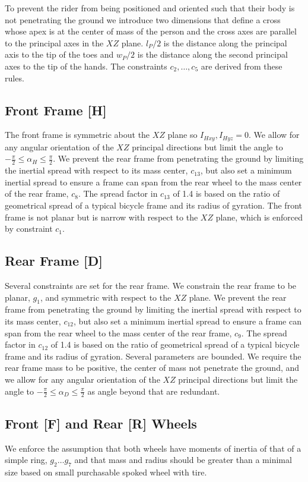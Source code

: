 \documentclass{bmd2019p}
\begin{document}
To prevent the rider from being positioned and oriented such that their body is
not penetrating the ground we introduce two dimensions that define a cross
whose apex is at the center of mass of the person and the cross axes are
parallel to the principal axes in the $XZ$ plane. $l_P / 2$ is the distance
along the principal axis to the tip of the toes and $w_P / 2$ is the distance
along the second principal axes to the tip of the hands. The constraints
$c_2,\ldots,c_5$ are derived from these rules.

\subsection{Front Frame [H]}
%
The front frame is symmetric about the $XZ$ plane so $I_{Hxy}, I_{Hyz} = 0$. We
allow for any angular orientation of the $XZ$ principal directions but limit
the angle to $-\frac{\pi}{2} \leq \alpha_H \leq \frac{\pi}{2}$. We prevent the
rear frame from penetrating the ground by limiting the inertial spread with
respect to its mass center, $c_{13}$, but also set a minimum inertial spread to
ensure a frame can span from the rear wheel to the mass center of the rear
frame, $c_8$. The spread factor in $c_{13}$ of 1.4 is based on the ratio of
geometrical spread of a typical bicycle frame and its radius of gyration. The
front frame is not planar but is narrow with respect to the $XZ$ plane, which
is enforced by constraint $c_1$.

\subsection{Rear Frame [D]}
%
Several constraints are set for the rear frame. We constrain the rear frame to
be planar, $g_1$, and symmetric with respect to the $XZ$ plane. We prevent the
rear frame from penetrating the ground by limiting the inertial spread with
respect to its mass center, $c_{12}$, but also set a minimum inertial spread to
ensure a frame can span from the rear wheel to the mass center of the rear
frame, $c_9$. The spread factor in $c_{12}$ of 1.4 is based on the ratio of
geometrical spread of a typical bicycle frame and its radius of gyration.
Several parameters are bounded. We require the rear frame mass to be positive,
the center of mass not penetrate the ground, and we allow for any angular
orientation of the $XZ$ principal directions but limit the angle to
$-\frac{\pi}{2} \leq \alpha_D \leq \frac{\pi}{2}$ as angle beyond that are
redundant.

\subsection{Front [F] and Rear [R] Wheels}
%
We enforce the assumption that both wheels have moments of inertia of that of a
simple ring, $g_2 \ldots g_7$ and that mass and radius should be greater than a
minimal size based on small purchasable spoked wheel with tire.
\end{document}
